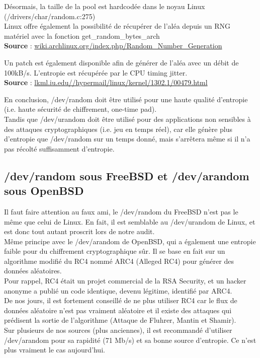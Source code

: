\documentclass{article}
\begin{document}
		Désormais, la taille de la pool est hardcodée dans le noyau Linux 
		(/drivers/char/random.c:275)\\
		
		Linux offre également la possibilité de récupérer de l’aléa depuis un 
		RNG matériel avec la fonction get\_random\_bytes\_arch\\

		\textbf{Source} :
		\href{https://wiki.archlinux.org/index.php/Random\_Number\_Generation}
		{wiki.archlinux.org/index.php/Random\_Number\_Generation}
	
		Un patch est également disponible afin de générer de l'aléa avec un 
		débit de 100kB/s. L'entropie est récupérée par le CPU timing jitter.\\
		
		\textbf{Source} :
		\href{http://lkml.iu.edu//hypermail/linux/kernel/1302.1/00479.html}
		{lkml.iu.edu//hypermail/linux/kernel/1302.1/00479.html}
		
		En conclusion, /dev/random doit être utilisé pour une haute qualité
		d'entropie (i.e. haute sécurité de chiffrement, one-time pad).\\
		Tandis que /dev/urandom doit être utilisé pour des applications non
		sensibles à des attaques cryptographiques (i.e. jeu en temps réel),
		car elle génère plus d'entropie que /dev/random sur un temps donné, 
		mais s'arrêtera même si il n'a pas récolté suffisamment d'entropie. 
	
	
	
	
	\subsection{/dev/random sous FreeBSD et /dev/arandom sous OpenBSD}
	
		Il faut faire attention au faux ami, le /dev/random du FreeBSD n'est pas 
		le même que celui de Linux.
		En fait, il est semblable au /dev/urandom de Linux, et est donc tout 
		autant proscrit lors de notre audit.\\
		
		Même principe avec le /dev/arandom de OpenBSD, qui a également une 
		entropie faible pour du chiffrement cryptographique sûr. Il se base
		en fait sur un algorithme modifié du RC4 nommé ARC4 (Alleged RC4) pour 
		générer des données aléatoires.\\
		Pour rappel, RC4 était un projet commercial de la RSA Security, et un 
		hacker anonyme a publié un code identique, devenu légitime, identifié par
		ARC4.\\
		De nos jours, il est fortement conseillé de ne plus utiliser RC4 car le 
		flux de données aléatoire n’est pas vraiment aléatoire et il existe des 
		attaques qui prédisent la sortie de l’algorithme (Attaque de Fluhrer, 
		Mantin et Shamir).\\
		Sur plusieurs de nos sources (plus anciennes), il est recommandé
		d'utiliser /dev/arandom pour sa rapidité (71 Mb/s) et sa bonne source
		d'entropie. Ce n'est plus vraiment le cas aujourd'hui.\\
\end{document}
